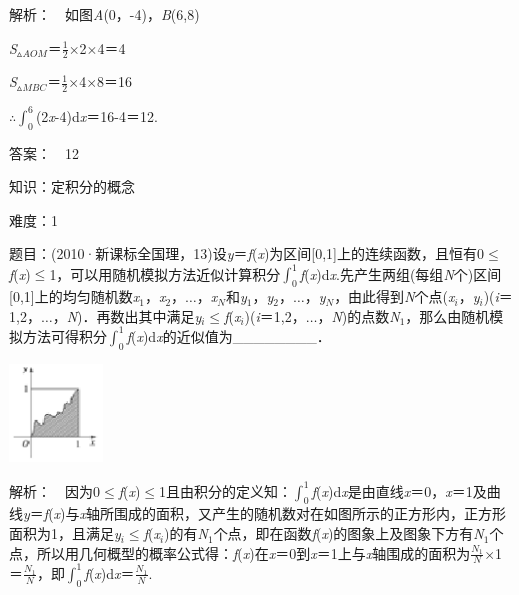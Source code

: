 \documentclass{article} %
\begin{document}
 解析：　如图\textit{A}(0，-4)，\textit{B}(6,8)

\textit{S}${}_{\mathrm{\vartriangle }}$\textit{${}_{AOM}$}＝$\frac{1}{2}\mathrm{\times}$2$\mathrm{\times}$4＝4

\textit{S}${}_{\mathrm{\vartriangle }}$\textit{${}_{MBC}$}＝$\frac{1}{2}\mathrm{\times}$4$\mathrm{\times}$8＝16

$\mathrm{\therefore}\int_0^6$(2\textit{x}-4)d\textit{x}＝16-4＝12.

 答案：　12



 知识：定积分的概念

 难度：1

 题目：(2010·新课标全国理，13)设\textit{y}＝\textit{f}(\textit{x})为区间[0,1]上的连续函数，且恒有0$\mathrm{\le}$\textit{f}(\textit{x})$\mathrm{\le}$1，可以用随机模拟方法近似计算积分$\int_0^1$\textit{f}(\textit{x})d\textit{x}.先产生两组(每组\textit{N}个)区间[0,1]上的均匀随机数\textit{x}${}_{1}$，\textit{x}${}_{2}$，{$\dots$}，\textit{x${}_{N}$}和\textit{y}${}_{1}$，\textit{y}${}_{2}$，{$\dots$}，\textit{y${}_{N}$}，由此得到\textit{N}个点(\textit{x${}_{i}$}，\textit{y${}_{i}$})(\textit{i}＝1,2，{$\dots$}，\textit{N})．再数出其中满足\textit{y${}_{i}$}$\mathrm{\le}$\textit{f}(\textit{x${}_{i}$})(\textit{i}＝1,2，{$\dots$}，\textit{N})的点数\textit{N}${}_{1}$，那么由随机模拟方法可得积分$\int_0^1$\textit{f}(\textit{x})d\textit{x}的近似值为\_\_\_\_\_\_\_\_．


 \includegraphics*[width=0.98in, height=1.03in, keepaspectratio=false]{image8}


 解析：　因为0$\mathrm{\le}$\textit{f}(\textit{x})$\mathrm{\le}$1且由积分的定义知：$\int_0^1$\textit{f}(\textit{x})d\textit{x}是由直线\textit{x}＝0，\textit{x}＝1及曲线\textit{y}＝\textit{f}(\textit{x})与\textit{x}轴所围成的面积，又产生的随机数对在如图所示的正方形内，正方形面积为1，且满足\textit{y${}_{i}$}$\mathrm{\le}$\textit{f}(\textit{x${}_{i}$})的有\textit{N}${}_{1}$个点，即在函数\textit{f}(\textit{x})的图象上及图象下方有\textit{N}${}_{1}$个点，所以用几何概型的概率公式得：\textit{f}(\textit{x})在\textit{x}＝0到\textit{x}＝1上与\textit{x}轴围成的面积为$\frac{N_1}{N}\mathrm{\times}$1＝$\frac{N_1}{N}$，即$\int_0^1$\textit{f}(\textit{x})d\textit{x}＝$\frac{N_1}{N}$.
\end{document}
